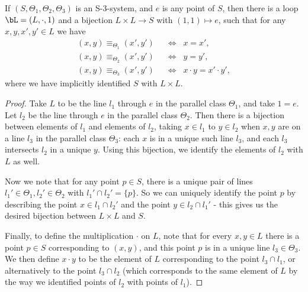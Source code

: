 \begin{lem}\label{S3-coords} If $(S,\Theta_1,\Theta_2,\Theta_3)$ is an S-3-system, and $e$ is any point of $S$, then there is a loop $\bL = (L,\cdot,1)$ and a bijection $L\times L \rightarrow S$ with $(1,1) \mapsto e$, such that for any $x,y,x',y' \in L$ we have
\begin{align*}
(x,y) \equiv_{\Theta_1} (x',y') \;\; &\iff \;\; x = x',\\
(x,y) \equiv_{\Theta_2} (x',y') \;\; &\iff \;\; y = y',\\
(x,y) \equiv_{\Theta_3} (x',y') \;\; &\iff \;\; x\cdot y = x'\cdot y',
\end{align*}
where we have implicitly identified $S$ with $L\times L$.
\end{lem}
\begin{proof} Take $L$ to be the line $l_1$ through $e$ in the parallel class $\Theta_1$, and take $1 = e$. Let $l_2$ be the line through $e$ in the parallel class $\Theta_2$. Then there is a bijection between elements of $l_1$ and elements of $l_2$, taking $x \in l_1$ to $y \in l_2$ when $x,y$ are on a line $l_3$ in the parallel class $\Theta_3$: each $x$ is in a unique such line $l_3$, and each $l_3$ intersects $l_2$ in a unique $y$. Using this bijection, we identify the elements of $l_2$ with $L$ as well.

Now we note that for any point $p \in S$, there is a unique pair of lines $l_1' \in \Theta_1, l_2' \in \Theta_2$ with $l_1' \cap l_2' = \{p\}$. So we can uniquely identify the point $p$ by describing the point $x \in l_1 \cap l_2'$ and the point $y \in l_2 \cap l_1'$ - this gives us the desired bijection between $L\times L$ and $S$.

\begin{center}
\end{center}

Finally, to define the multiplication $\cdot$ on $L$, note that for every $x,y \in L$ there is a point $p \in S$ corresponding to $(x,y)$, and this point $p$ is in a unique line $l_3 \in \Theta_3$. We then define $x\cdot y$ to be the element of $L$ corresponding to the point $l_3 \cap l_1$, or alternatively to the point $l_3 \cap l_2$ (which corresponds to the same element of $L$ by the way we identified points of $l_2$ with points of $l_1$).
\end{proof}

